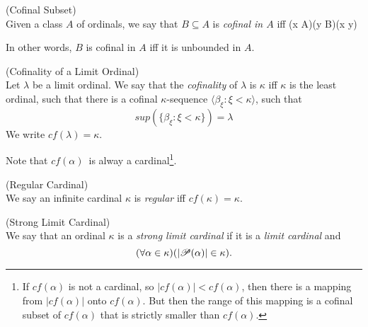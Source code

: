 \begin{definition}{(Cofinal Subset)}\label{def:cofinal_subset}\\
Given a class $A$ of ordinals, we say that $B \subseteq A$ is \emph{cofinal in $A$} iff
\beq
(\forall x \in A)(\exists y \in B)(x \in y)
\eeq
\end{definition}
In other words, $B$ is cofinal in $A$ iff it is unbounded in $A$. %

\begin{definition}{(Cofinality of a Limit Ordinal)}\label{def:cofinality}\\ %
Let $\lambda$ be a limit ordinal. 
We say that the \emph{cofinality} of $\lambda$ is $\kappa$ iff $\kappa$ is the least ordinal, such that there is a cofinal $\kappa$-sequence $\langle \beta_\xi : \xi < \kappa \rangle$, such that
\begin{equation}
sup(\{\beta_\xi: \xi < \kappa\}) = \lambda
\end{equation}
We write $cf(\lambda) = \kappa$.
\end{definition}
Note that $cf(\alpha)$ is alway a cardinal\footnote{If $cf(\alpha)$ is not a cardinal, so $|cf(\alpha)| < cf(\alpha)$, then there is a mapping from $|cf(\alpha)|$ onto $cf(\alpha)$. But then the range of this mapping is a cofinal subset of $cf(\alpha)$ that is strictly smaller than $cf(\alpha)$.}.

\begin{definition}{(Regular Cardinal)}\label{def:regular_cardinal}\\
We say an infinite cardinal $\kappa$ is \emph{regular} iff $cf(\kappa) = \kappa$. %
\end{definition}


\begin{definition}{(Strong Limit Cardinal)}\label{def:strong_limit_cardinal}\\
We say that an ordinal $\kappa$ is a \emph{strong limit cardinal} if it is a \emph{limit cardinal} and 
\begin{equation}
(\forall \alpha \in \kappa)(|\mathscr{P} (\alpha)| \in \kappa)\mbox{.}
\end{equation}
\end{definition}

